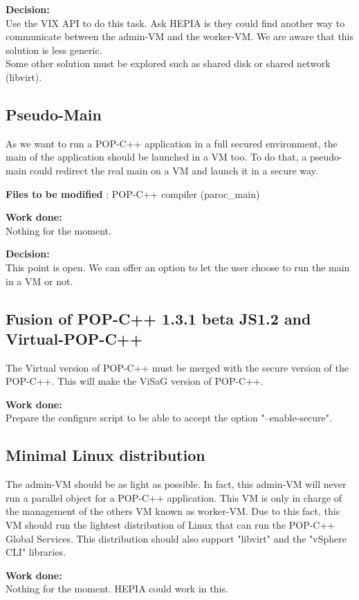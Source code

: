 \textbf{Decision:}\\
Use the VIX API to do this task. Ask HEPIA is they could find another way to communicate between the admin-VM and the worker-VM. We are aware that this solution is less generic.\\
Some other solution must be explored such as shared disk or shared network (libvirt).

\subsection{Pseudo-Main}
As we want to run a POP-C++ application in a full secured environment, the main of the application should be launched in a VM too. To do that, a pseudo-main could redirect the real main on a VM and launch it in a secure way.\s

\textbf{Files to be modified} : POP-C++ compiler (paroc\_main)\s

\textbf{Work done:}\\
Nothing for the moment.\s

\textbf{Decision:}\\
This point is open. We can offer an option to let the user choose to run the main in a VM or not.

\subsection{Fusion of POP-C++ 1.3.1 beta JS1.2 and Virtual-POP-C++}
The Virtual version of POP-C++ must be merged with the secure version of the POP-C++. This will make the ViSaG version of POP-C++.\s

\textbf{Work done:}\\
Prepare the configure script to be able to accept the option "--enable-secure". 

\subsection{Minimal Linux distribution}
The admin-VM should be as light as possible. In fact, this admin-VM will never run a parallel object for a POP-C++ application. This VM is only in charge of the management of the others VM known as worker-VM. Due to this fact, this VM should run the lightest distribution of Linux that can run the POP-C++ Global Services. This distribution should also support "libvirt" and the "vSphere CLI" libraries.\s

\textbf{Work done:}\\
Nothing for the moment. HEPIA could work in this. 

